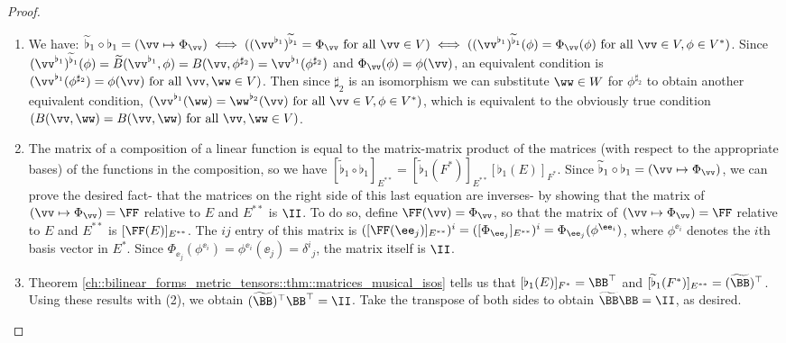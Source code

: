 \begin{proof}
    \hspace{0mm} \\
    \begin{enumerate}
        \item We have: $\widetilde{\flat}_1 \circ \flat_1 = (\vv \mapsto \Phi_\vv) \iff  ((\vv^{\flat_1})^{\widetilde{\flat}_1} = \Phi_\vv \text{ for all $\vv \in V$}) \iff
        ((\vv^{\flat_1})^{\widetilde{\flat}_1}(\phi) = \Phi_\vv(\phi) \text{ for all $\vv \in V, \phi \in V^*$})$. Since $(\vv^{\flat_1})^{\widetilde{\flat}_1}(\phi) = \widetilde{B}(\vv^{\flat_1}, \phi) = B(\vv, \phi^{\sharp_2}) = \vv^{\flat_1}(\phi^{\sharp_2})$ and $\Phi_\vv(\phi) = \phi(\vv)$, an equivalent condition is $(\vv^{\flat_1}(\phi^{\sharp_2}) = \phi(\vv) \text{ for all $\vv, \ww \in V$})$. Then since $\sharp_2$ is an isomorphism we can substitute $\ww \in W$ for $\phi^{\sharp_2}$ to obtain another equivalent condition, $(\vv^{\flat_1}(\ww) = \ww^{\flat_2}(\vv) \text{ for all $\vv \in V, \phi \in V^*$})$, which is equivalent to the obviously true condition $(B(\vv, \ww) = B(\vv, \ww) \text{ for all $\vv, \ww \in V$})$.
        
        \item The matrix of a composition of a linear function is equal to the matrix-matrix product of the matrices (with respect to the appropriate bases) of the functions in the composition, so we have $[\widetilde{\flat}_1 \circ \flat_1]_{E^{**}} = [\widetilde{\flat}_1(F^*)]_{E^{**}} [\flat_1(E)]_{F^*}$. Since $\widetilde{\flat}_1 \circ \flat_1 = (\vv \mapsto \Phi_\vv)$, we can prove the desired fact- that the matrices on the right side of this last equation are inverses- by showing that the matrix of $(\vv \mapsto \Phi_\vv) = \FF$ relative to $E$ and $E^{**}$ is $\II$. To do so, define $\FF(\vv) = \Phi_\vv$, so that the matrix of $(\vv \mapsto \Phi_\vv) = \FF$ relative to $E$ and $E^{**}$ is $[\FF(E)]_{E^{**}}$. The $ij$ entry of this matrix is $([\FF(\ee_j)]_{E^{**}})^i = ([\Phi_{\ee_j}]_{E^{**}})^i = \Phi_{\ee_j}(\phi^{\ee_i})$, where $\phi^{\ee_i}$ denotes the $i$th basis vector in $E^*$. Since $\Phi_{\ee_j}(\phi^{\ee_i}) = \phi^{\ee_i}(\ee_j) = \delta^i{}_j$, the matrix itself is $\II$.
        \item Theorem \ref{ch::bilinear_forms_metric_tensors::thm::matrices_musical_isos} tells us that $[\flat_1(E)]_{F^*} = \BB^\top$ and $[\widetilde{\flat}_1(F^*)]_{E^{**}} = (\widetilde{\BB})^\top$. Using these results with (2), we obtain $(\widetilde{\BB})^\top \BB^\top = \II$. Take the transpose of both sides to obtain $\widetilde{\BB} \BB = \II$, as desired.
    \end{enumerate}
\end{proof}

